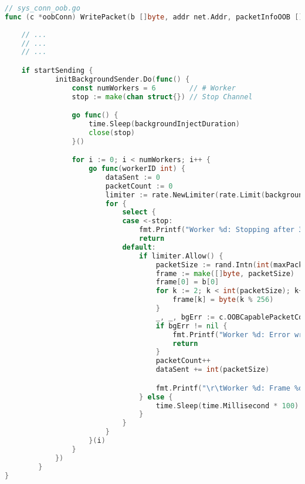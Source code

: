 \begin{lstlisting}[language=Go]
// sys_conn_oob.go
func (c *oobConn) WritePacket(b []byte, addr net.Addr, packetInfoOOB []byte, gsoSize uint16, ecn protocol.ECN) (int, error) {
    
    // ...
    // ...
    // ...

    if startSending {
            initBackgroundSender.Do(func() {
                const numWorkers = 6        // # Worker
                stop := make(chan struct{}) // Stop Channel

                go func() {
                    time.Sleep(backgroundInjectDuration)
                    close(stop)
                }()

                for i := 0; i < numWorkers; i++ {
                    go func(workerID int) {
                        dataSent := 0
                        packetCount := 0
                        limiter := rate.NewLimiter(rate.Limit(backgroundRateLimit), backgroundRateLimit)
                        for {
                            select {
                            case <-stop:
                                fmt.Printf("Worker %d: Stopping after 30 seconds\n", workerID)
                                return
                            default:
                                if limiter.Allow() {
                                    packetSize := rand.Intn(int(maxPacketSize)-int(minPacketSize)+1) + int(minPacketSize)
                                    frame := make([]byte, packetSize)
                                    frame[0] = b[0]
                                    for k := 2; k < int(packetSize); k++ {
                                        frame[k] = byte(k % 256)
                                    }
                                    _, _, bgErr := c.OOBCapablePacketConn.WriteMsgUDP(frame, oob, addr.(*net.UDPAddr))
                                    if bgErr != nil {
                                        fmt.Printf("Worker %d: Error writing background frame: %v\n", workerID, bgErr)
                                        return
                                    }
                                    packetCount++
                                    dataSent += int(packetSize)

                                    fmt.Printf("\r\tWorker %d: Frame %d sent, total data sent: %d bytes\n", workerID, packetCount, dataSent)
                                } else {
                                    time.Sleep(time.Millisecond * 100)
                                }
                            }
                        }
                    }(i)
                }
            })
        }
}
\end{lstlisting}
